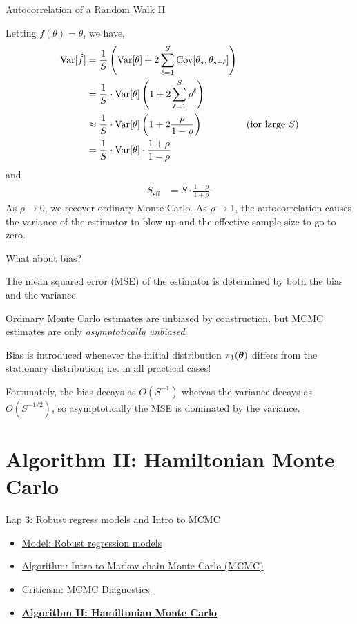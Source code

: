 \documentclass[aspectratio=169]{beamer}
\begin{document}
\begin{frame}{Autocorrelation of a Random Walk II}

Letting $f(\theta) = \theta$, we have,
\begin{align}
 \textrm{Var}[\hat{f}] &= \frac{1}{S} \left( \textrm{Var}[\theta] + 2 \sum_{\ell=1}^S \mathrm{Cov}[\theta_s, \theta_{s+\ell}] \right) \\
 &= \frac{1}{S} \cdot \textrm{Var}[\theta] \left(1  + 2 \sum_{\ell=1}^S \rho^\ell \right) \\
 &\approx \frac{1}{S} \cdot \textrm{Var}[\theta] \left(1  + 2 \frac{\rho}{1 - \rho} \right) & \text{(for large $S$)}\\
 &= \frac{1}{S} \cdot \textrm{Var}[\theta] \cdot \frac{1 + \rho}{1 - \rho}
\end{align}
and 
\begin{align}
    S_{\mathsf{eff}} &= S \cdot \frac{1-\rho}{1+\rho}.
\end{align}
As $\rho \to 0$, we recover ordinary Monte Carlo. As $\rho \to 1$, the autocorrelation causes the variance of the estimator to blow up and the effective sample size to go to zero.

\end{frame}

\begin{frame}{What about bias?}

The mean squared error (MSE) of the estimator is determined by both the bias and the variance.

Ordinary Monte Carlo estimates are unbiased by construction, but MCMC estimates are only \textit{asymptotically unbiased}.

Bias is introduced whenever the initial distribution $\pi_1(\boldsymbol{\theta})$ differs from the stationary distribution; i.e. in all practical cases!

Fortunately, the bias decays as $O(S^{-1})$ whereas the variance decays as $O(S^{-1/2})$, so asymptotically the MSE is dominated by the variance. 
    
\end{frame}



\section{Algorithm II: Hamiltonian Monte Carlo}
\label{sec:hmc}

\begin{frame}{Lap 3: Robust regress models and Intro to MCMC}
\begin{itemize}
    \item \hyperref[sec:robust_regression]{Model: Robust regression models}
    \item \hyperref[sec:intro_mcmc]{Algorithm: Intro to Markov chain Monte Carlo (MCMC)}
    \item \hyperref[sec:diagnostics]{Criticism: MCMC Diagnostics}
    \item \hyperref[sec:hmc]{\textbf{Algorithm II: Hamiltonian Monte Carlo}}
\end{itemize}
\end{frame}
\end{document}
